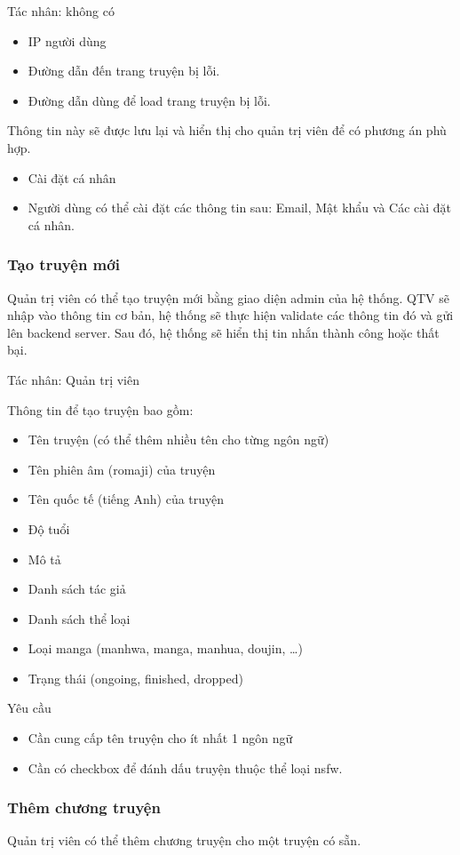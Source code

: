 \documentclass[./../main.tex]{subfiles}
\begin{document}
Tác nhân: không có
\begin{itemize}
\item IP người dùng
\item Đường dẫn đến trang truyện bị lỗi.
\item Đường dẫn dùng để load trang truyện bị lỗi.
\end{itemize}
Thông tin này sẽ được lưu lại và hiển thị cho quản trị viên để có phương án phù hợp.
\begin{itemize}
\item Cài đặt cá nhân
\item Người dùng có thể cài đặt các thông tin sau: Email, Mật khẩu và Các cài đặt cá nhân.
\end{itemize}

\subsubsection{Tạo truyện mới}
Quản trị viên có thể tạo truyện mới bằng giao diện admin của hệ thống.
QTV sẽ nhập vào thông tin cơ bản, hệ thống sẽ thực hiện validate các thông tin đó và gửi lên backend server.
Sau đó, hệ thống sẽ hiển thị tin nhắn thành công hoặc thất bại.


Tác nhân: Quản trị viên


Thông tin để tạo truyện bao gồm:
\begin{itemize}
\item Tên truyện (có thể thêm nhiều tên cho từng ngôn ngữ)
\item Tên phiên âm (romaji) của truyện
\item Tên quốc tế (tiếng Anh) của truyện
\item Độ tuổi
\item Mô tả
\item Danh sách tác giả
\item Danh sách thể loại
\item Loại manga (manhwa, manga, manhua, doujin, …)
\item Trạng thái (ongoing, finished, dropped)
\end{itemize}
Yêu cầu
\begin{itemize}
\item Cần cung cấp tên truyện cho ít nhất 1 ngôn ngữ
\item Cần có checkbox để đánh dấu truyện thuộc thể loại nsfw.
\end{itemize}

\subsubsection{Thêm chương truyện}
Quản trị viên có thể thêm chương truyện cho một truyện có sẵn.
\end{document}
